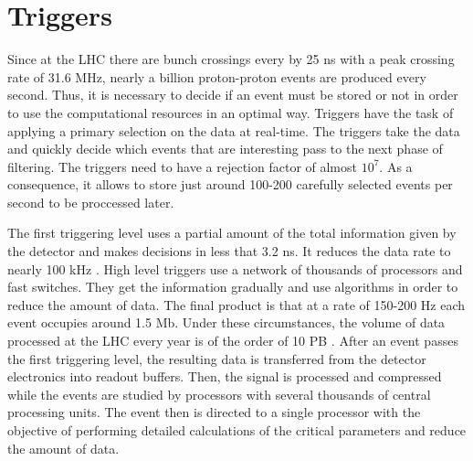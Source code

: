 \section{Triggers}

Since at the LHC there are bunch crossings every by 25 ns with a peak crossing rate of 31.6 MHz, nearly a billion proton-proton events are produced every second. Thus, it is necessary to decide
if an event must be stored or not in order to use the computational resources in an optimal way. Triggers have the task of applying a primary selection on the data at real-time. The triggers take the data and quickly decide which events that are interesting pass to the next phase of filtering. The triggers need to have a rejection factor of almost $10^7$. As a consequence, it allows to store just around 100-200 carefully selected events per second to be proccessed later. 

The first triggering level uses a partial amount of the total information given by the detector and makes decisions in less that 3.2 ns. It reduces the data rate to nearly 100 kHz \cite{LHC_collitions_web}. High level triggers use a network of thousands of processors and fast switches. They get the information gradually and use algorithms in order to reduce the amount of data. The final product is that at a rate of 150-200 Hz each event occupies around 1.5 Mb. Under these circumstances, the volume of data processed at the LHC every year is of the order of 10 PB  \cite{Perspectives_LHC}. After an event passes the first triggering level, the resulting data is transferred from the detector electronics into readout buffers. Then, the signal is processed and compressed while the events are studied by processors with several thousands of central processing units. The event then is directed to a single processor with the objective of performing detailed calculations of the critical parameters and reduce the amount of data.






